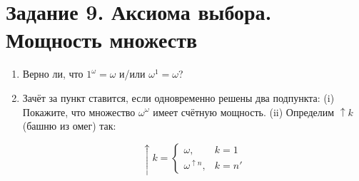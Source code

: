 \documentclass[10pt,a4paper,oneside]{article}
\begin{document}
\section*{Задание 9. Аксиома выбора. Мощность множеств}
\begin{enumerate}
\item Верно ли, что $1^\omega = \omega$ и/или $\omega^1 = \omega$?
\item Зачёт за пункт ставится, если одновременно решены два подпункта:
(i) Покажите, что множество $\omega^\omega$ имеет счётную мощность. 
(ii) Определим $\uparrow k$ (башню из омег) так:

$$\uparrow k = \left\{\begin{array}{ll}\omega,&k = 1\\\omega^{\uparrow n},&k = n'\end{array}\right.$$


\end{enumerate}
\end{document}
